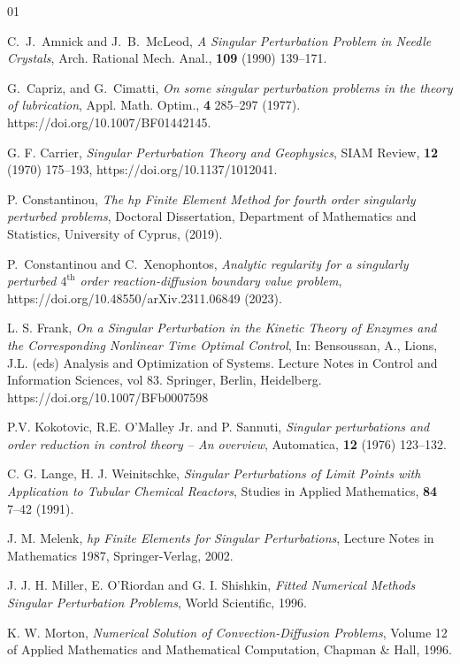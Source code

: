 \documentclass[12pt]{article}
\begin{document}

\begin{thebibliography}{01}

  C.~J.~Amnick and J.~B.~McLeod, \emph{A Singular Perturbation Problem in Needle Crystals}, Arch. Rational Mech. Anal., \textbf{109} (1990) 139--171.

G.~Capriz, and G.~Cimatti, \emph{On some singular perturbation problems in the theory of lubrication}, Appl. Math. Optim., \textbf{4} 285–297 (1977). https://doi.org/10.1007/BF01442145.

 G. F. Carrier, \emph{Singular Perturbation Theory and Geophysics}, SIAM Review, 
\textbf{12} (1970) 175--193, https://doi.org/10.1137/1012041.

 P. Constantinou, \emph{The hp Finite Element Method for fourth
order singularly perturbed problems}, Doctoral Dissertation, Department of
Mathematics and Statistics, University of Cyprus, (2019).

 P.~Constantinou and C.~Xenophontos, \emph{Analytic regularity for a singularly perturbed $4^{\text{th}}$ order reaction-diffusion boundary value problem}, https://doi.org/10.48550/arXiv.2311.06849 (2023).

 L. S. Frank, \emph{On a Singular Perturbation in the Kinetic Theory of Enzymes and the Corresponding Nonlinear Time Optimal Control}, In: Bensoussan, A., Lions, J.L. (eds) Analysis and Optimization of Systems. Lecture Notes in Control and Information Sciences, vol 83. Springer, Berlin, Heidelberg. https://doi.org/10.1007/BFb0007598

P.V. Kokotovic, R.E. O'Malley Jr. and P. Sannuti, \emph{Singular perturbations and order reduction in control theory -- An overview}, Automatica, \textbf{12} (1976) 123--132.

 C. G. Lange, H. J. Weinitschke, \emph{Singular Perturbations of Limit Points with Application to Tubular Chemical Reactors}, Studies in Applied Mathematics, \textbf{84} 7--42 (1991).

 J. M. Melenk, \emph{hp Finite Elements for Singular Perturbations}, 
Lecture Notes in Mathematics 1987, Springer-Verlag, 2002.

 J. J. H. Miller, E. O'Riordan and G. I. Shishkin, \emph{Fitted
Numerical Methods Singular Perturbation Problems}, World Scientific, 1996.

 K. W. Morton, \emph{Numerical Solution of
Convection-Diffusion Problems}, Volume 12 of Applied Mathematics and
Mathematical Computation, Chapman \& Hall, 1996.


\end{thebibliography}
\end{document}
